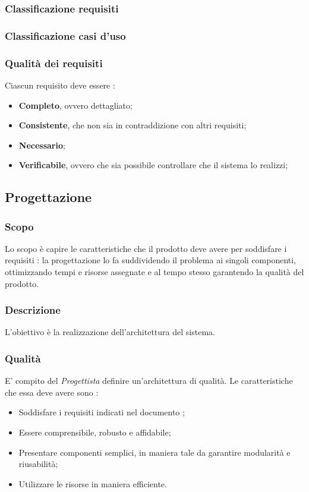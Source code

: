 \subsubsection{Classificazione requisiti}

\subsubsection{Classificazione casi d'uso}

\subsubsection{Qualità dei requisiti}
Ciascun requisito deve essere :
\begin{itemize}
  \item \textbf{Completo}, ovvero dettagliato;
  \item \textbf{Consistente}, che non sia in contraddizione con altri requisiti;
  \item \textbf{Necessario};
  \item \textbf{Verificabile}, ovvero che sia possibile controllare che il sistema lo realizzi;
\end{itemize}

\subsection{Progettazione}
\subsubsection{Scopo}
Lo scopo è capire le caratteristiche che il prodotto deve avere per soddisfare i requisiti : la progettazione lo fa suddividendo il problema ai singoli componenti, ottimizzando tempi e risorse assegnate e al tempo stesso garantendo la qualità del prodotto.

\subsubsection{Descrizione}
L’obiettivo è la realizzazione dell’architettura del sistema.

\subsubsection{Qualità}
E’ compito del \textit{Progettista} definire un’architettura di qualità. Le caratteristiche che essa deve avere sono :
\begin{itemize}
  \item Soddisfare i requisiti indicati nel documento \AdR;
  \item Essere comprensibile, robusto e affidabile;
  \item Presentare componenti semplici, in maniera tale da garantire modularità e riusabilità;
  \item Utilizzare le risorse in maniera efficiente.
\end{itemize}

